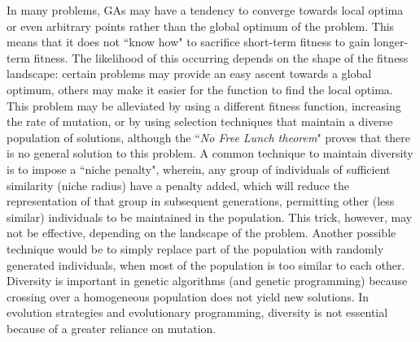 In many problems, GAs may have a tendency to converge towards local optima or even arbitrary points rather than the global optimum of the problem. This means that it does not ``know how" to sacrifice short-term fitness to gain longer-term fitness. The likelihood of this occurring depends on the shape of the fitness landscape: certain problems may provide an easy ascent towards a global optimum, others may make it easier for the function to find the local optima. This problem may be alleviated by using a different fitness function, increasing the rate of mutation, or by using selection techniques that maintain a diverse population of solutions, although the ``\emph{No Free Lunch theorem}" proves that there is no general solution to this problem. A common technique to maintain diversity is to impose a ``niche penalty", wherein, any group of individuals of sufficient similarity (niche radius) have a penalty added, which will reduce the representation of that group in subsequent generations, permitting other (less similar) individuals to be maintained in the population. This trick, however, may not be effective, depending on the landscape of the problem. Another possible technique would be to simply replace part of the population with randomly generated individuals, when most of the population is too similar to each other. Diversity is important in genetic algorithms (and genetic programming) because crossing over a homogeneous population does not yield new solutions. In evolution strategies and evolutionary programming, diversity is not essential because of a greater reliance on mutation.